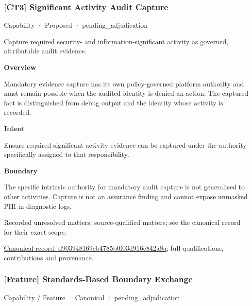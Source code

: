 \subsubsection{[CT3] Significant Activity Audit Capture}

\label{element:d903948169eb4785b0f03d916c842a8a}
{\small Capability · Proposed · pending\_adjudication}\par

Capture required security- and information-significant activity as governed, attributable audit evidence.



\textbf{Overview}



Mandatory evidence capture has its own policy-governed platform authority and must remain possible when the audited identity is denied an action. The captured fact is distinguished from debug output and the identity whose activity is recorded.



\textbf{Intent}



Ensure required significant activity evidence can be captured under the authority specifically assigned to that responsibility.



\textbf{Boundary}



The specific intrinsic authority for mandatory audit capture is not generalised to other activities. Capture is not an assurance finding and cannot expose unmasked PHI in diagnostic logs.


{\small Recorded unresolved matters: source-qualified matters; see the canonical record for their exact scope.}\par
{\footnotesize \href{../../../../continuum/strategy/capability/d903948169eb4785b0f03d916c842a8a.md}{Canonical record: d903948169eb4785b0f03d916c842a8a}; full qualifications, contributions and provenance.}\par
\subsubsection{[Feature] Standards-Based Boundary Exchange}

\label{element:3192ba1541ff41458d176184119c30bc}
{\small Capability / Feature · Canonical · pending\_adjudication}\par

